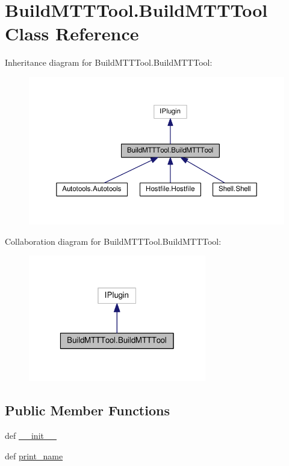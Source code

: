 \hypertarget{class_build_m_t_t_tool_1_1_build_m_t_t_tool}{\section{Build\-M\-T\-T\-Tool.\-Build\-M\-T\-T\-Tool Class Reference}
\label{class_build_m_t_t_tool_1_1_build_m_t_t_tool}
}


Inheritance diagram for Build\-M\-T\-T\-Tool.\-Build\-M\-T\-T\-Tool\-:
\nopagebreak
\begin{figure}[H]
\begin{center}
\leavevmode
\includegraphics[width=350pt]{class_build_m_t_t_tool_1_1_build_m_t_t_tool__inherit__graph}
\end{center}
\end{figure}


Collaboration diagram for Build\-M\-T\-T\-Tool.\-Build\-M\-T\-T\-Tool\-:
\nopagebreak
\begin{figure}[H]
\begin{center}
\leavevmode
\includegraphics[width=220pt]{class_build_m_t_t_tool_1_1_build_m_t_t_tool__coll__graph}
\end{center}
\end{figure}
\subsection*{Public Member Functions}
\begin{DoxyCompactItemize}
\item 
def \hyperlink{class_build_m_t_t_tool_1_1_build_m_t_t_tool_a5665b0ed7a6ef42181601533cdbe74be}{\-\_\-\-\_\-init\-\_\-\-\_\-}
\item 
def \hyperlink{class_build_m_t_t_tool_1_1_build_m_t_t_tool_afbb7e8957f4c8c43e2937489173de162}{print\-\_\-name}
\end{DoxyCompactItemize}


